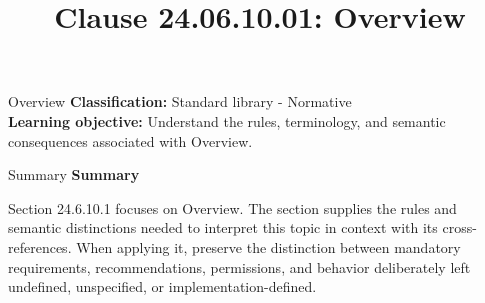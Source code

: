 \documentclass[10pt,letterpaper]{article}
\title{Clause 24.06.10.01: Overview}
\author{}
\date{}
\begin{document}
\maketitle
\begin{CornellOverviewBox}{Overview}
\textbf{Classification:} Standard library - Normative\\[2pt]
\textbf{Learning objective:} Understand the rules, terminology, and semantic consequences associated with Overview.
\end{CornellOverviewBox}\begin{CornellSummaryBox}{Summary}
{\sffamily\bfseries\color{Accent} Summary}\par\vspace{3pt}Section 24.6.10.1 focuses on Overview. The section supplies the rules and semantic distinctions needed to interpret this topic in context with its cross-references. When applying it, preserve the distinction between mandatory requirements, recommendations, permissions, and behavior deliberately left undefined, unspecified, or implementation-defined.
\end{CornellSummaryBox}
\end{document}
